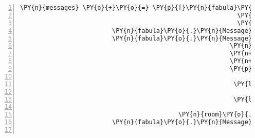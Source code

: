 \begin{Verbatim}[commandchars=\\\{\},numbers=left,firstnumber=1,stepnumber=1]
            \PY{n}{messages} \PY{o}{+}\PY{o}{=} \PY{p}{[}\PY{n}{fabula}\PY{o}{.}\PY{n}{Message}\PY{p}{(}\PY{p}{[}\PY{n}{fabula}\PY{o}{.}\PY{n}{DropsEvent}\PY{p}{(}\PY{n}{ID\PYZus{}CASSANDRA}\PY{p}{,}
                                                           \PY{n+nb+bp}{self}\PY{o}{.}\PY{n}{host}\PY{o}{.}\PY{n}{rack}\PY{o}{.}\PY{n}{entity\PYZus{}dict}\PY{p}{[}\PY{l+s}{\PYZsq{}}\PY{l+s}{pry}\PY{l+s}{\PYZsq{}}\PY{p}{]}\PY{p}{,}
                                                           \PY{n}{room}\PY{o}{.}\PY{n}{entity\PYZus{}locations}\PY{p}{[}\PY{l+s}{\PYZsq{}}\PY{l+s}{box}\PY{l+s}{\PYZsq{}}\PY{p}{]}\PY{p}{)}\PY{p}{]}\PY{p}{)}\PY{p}{,}
                         \PY{n}{fabula}\PY{o}{.}\PY{n}{Message}\PY{p}{(}\PY{p}{[}\PY{n}{fabula}\PY{o}{.}\PY{n}{DeleteEvent}\PY{p}{(}\PY{n}{identifier}\PY{o}{=}\PY{l+s}{\PYZsq{}}\PY{l+s}{pry}\PY{l+s}{\PYZsq{}}\PY{p}{)}\PY{p}{]}\PY{p}{)}\PY{p}{,}
                         \PY{n}{fabula}\PY{o}{.}\PY{n}{Message}\PY{p}{(}\PY{p}{[}\PY{n}{fabula}\PY{o}{.}\PY{n}{SpawnEvent}\PY{p}{(}\PY{n}{fabula}\PY{o}{.}\PY{n}{Entity}\PY{p}{(}\PY{l+s}{\PYZsq{}}\PY{l+s}{lute\PYZus{}broken}\PY{l+s}{\PYZsq{}}\PY{p}{,}
                                                         \PY{n}{fabula}\PY{o}{.}\PY{n}{ITEM}\PY{p}{,}
                                                         \PY{n+nb+bp}{True}\PY{p}{,}
                                                         \PY{n+nb+bp}{True}\PY{p}{,}
                                                         \PY{p}{\PYZob{}}\PY{l+s}{\PYZsq{}}\PY{l+s}{image/png}\PY{l+s}{\PYZsq{}}\PY{p}{:} \PY{n}{fabula}\PY{o}{.}\PY{n}{Asset}\PY{p}{(}\PY{n}{uri}\PY{o}{=}\PY{l+s}{\PYZsq{}}\PY{l+s}{lute\PYZus{}broken.png}\PY{l+s}{\PYZsq{}}\PY{p}{,}
                                                                                    \PY{n}{data}\PY{o}{=}\PY{n+nb+bp}{None}\PY{p}{)}\PY{p}{,}
                                                          \PY{l+s}{\PYZsq{}}\PY{l+s}{audio/ogg}\PY{l+s}{\PYZsq{}}\PY{p}{:} \PY{n}{fabula}\PY{o}{.}\PY{n}{Asset}\PY{p}{(}\PY{n}{uri}\PY{o}{=}\PY{l+s}{\PYZsq{}}\PY{l+s}{lute\PYZus{}broken.ogg}\PY{l+s}{\PYZsq{}}\PY{p}{,}
                                                                                    \PY{n}{data}\PY{o}{=}\PY{n+nb+bp}{None}\PY{p}{)}\PY{p}{,}
                                                          \PY{l+s}{\PYZsq{}}\PY{l+s}{text/plain}\PY{l+s}{\PYZsq{}}\PY{p}{:} \PY{n}{fabula}\PY{o}{.}\PY{n}{Asset}\PY{p}{(}\PY{n}{uri}\PY{o}{=}\PY{l+s}{\PYZsq{}}\PY{l+s}{lute\PYZus{}broken.txt}\PY{l+s}{\PYZsq{}}\PY{p}{,}
                                                                                     \PY{n}{data}\PY{o}{=}\PY{n+nb+bp}{None}\PY{p}{)}\PY{p}{\PYZcb{}}\PY{p}{)}\PY{p}{,}
                                           \PY{n}{room}\PY{o}{.}\PY{n}{entity\PYZus{}locations}\PY{p}{[}\PY{l+s}{\PYZsq{}}\PY{l+s}{box}\PY{l+s}{\PYZsq{}}\PY{p}{]} \PY{o}{+} \PY{p}{(}\PY{n}{room}\PY{o}{.}\PY{n}{identifier}\PY{p}{,}\PY{p}{)}\PY{p}{)}\PY{p}{]}\PY{p}{)}\PY{p}{,}
                         \PY{n}{fabula}\PY{o}{.}\PY{n}{Message}\PY{p}{(}\PY{p}{[}\PY{n}{fabula}\PY{o}{.}\PY{n}{DeleteEvent}\PY{p}{(}\PY{n}{identifier}\PY{o}{=}\PY{l+s}{\PYZsq{}}\PY{l+s}{box}\PY{l+s}{\PYZsq{}}\PY{p}{)}\PY{p}{]}\PY{p}{)}\PY{p}{]}


\end{Verbatim}
